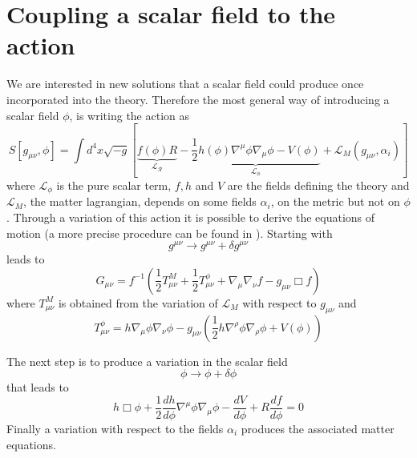 \section{Coupling a scalar field to the action}
We are interested in new solutions that a scalar field could produce once incorporated into the theory. Therefore the most general way of introducing a scalar field $\phi$, is writing the action as 
\begin{equation}
    S[g_{\mu \nu}, \phi] = \int d^4x \sqrt{-g} \left[ \underbrace{f(\phi)R}_{\mathcal{L_R}}  - \underbrace{\frac{1}{2}h(\phi)\nabla^{\mu}\phi \nabla_{\mu}\phi - V(\phi)}_{\mathcal{L_{\phi}}} + \mathcal{L}_M(g_{\mu \nu}, \alpha_i)\right]
    \label{azione totale scalare tensoriale}
\end{equation}
where $\mathcal{L_{\phi}}$ is the pure scalar term, $f, h$ and $V$ are the fields defining the theory and $\mathcal{L}_M$, the matter lagrangian, depends on some fields $\alpha_i$, on the metric but not on $\phi$. Through a variation of this action it is possible to derive the equations of motion (a more precise procedure can be found in \citep{Carroll_2019}). 
Starting with 
\begin{equation*}
    g^{\mu \nu} \longrightarrow g^{\mu \nu} + \delta g^{\mu \nu}
\end{equation*}
leads to 
\begin{equation}
    G_{\mu \nu} = f^{-1} \left(\frac{1}{2}T_{\mu \nu}^M + \frac{1}{2}T_{\mu \nu}^{\phi} + \nabla_{\mu}\nabla_{\nu}f  - g_{\mu \nu} \Box f \right)
    \label{einstein scalare tensoriale}
\end{equation}
where $T_{\mu \nu}^M$ is obtained from the variation of $\mathcal{L}_M$ with respect to $g_{\mu \nu}$ and 
\begin{equation}
    T_{\mu \nu}^{\phi} = h \nabla_{\mu}\phi \nabla_{\nu}\phi - g_{\mu \nu}\left( \frac{1}{2}h\nabla^{\rho}\phi\nabla_{\rho}\phi + V(\phi)\right)
    \label{klein gordon scalare tensoriale}
\end{equation}

The next step is to produce a variation in the scalar field 
\begin{equation*}
    \phi \longrightarrow \phi + \delta \phi
\end{equation*}
that leads to 
\begin{equation}
    h \Box \phi + \frac{1}{2} \frac{d h}{d\phi} \nabla^{\mu}\phi \nabla_{\mu}\phi - \frac{d V}{d\phi} + R\frac{d f}{d\phi} = 0
\end{equation}
Finally a variation with respect to the fields $\alpha_i$ produces the associated matter equations.

